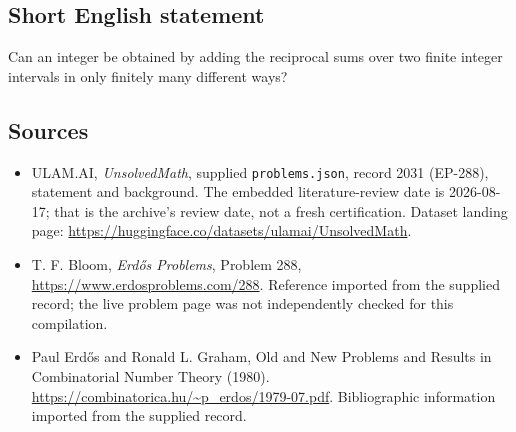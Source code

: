 \documentclass[11pt,a4paper]{article}
\begin{document}
\subsection{Short English statement}

Can an integer be obtained by adding the reciprocal sums over two finite integer intervals in only finitely many different ways?

\subsection{Sources}

{\small

\begin{itemize}

\item[\hypertarget{source:2031:1}{S1}] ULAM.AI, \emph{UnsolvedMath}, supplied \texttt{problems.json}, record 2031 (EP-288), statement and background. The embedded literature-review date is 2026-08-17; that is the archive’s review date, not a fresh certification. Dataset landing page: \url{https://huggingface.co/datasets/ulamai/UnsolvedMath}.

\item[\hypertarget{source:2031:2}{S2}] T. F. Bloom, \emph{Erdős Problems}, Problem 288, \url{https://www.erdosproblems.com/288}. Reference imported from the supplied record; the live problem page was not independently checked for this compilation.

\item[\hypertarget{source:2031:3}{S3}] Paul Erdős and Ronald L. Graham, Old and New Problems and Results in Combinatorial Number Theory (1980). \url{https://combinatorica.hu/~p_erdos/1979-07.pdf}. Bibliographic information imported from the supplied record.

\end{itemize}

}

\label{end:2031}
\end{document}
